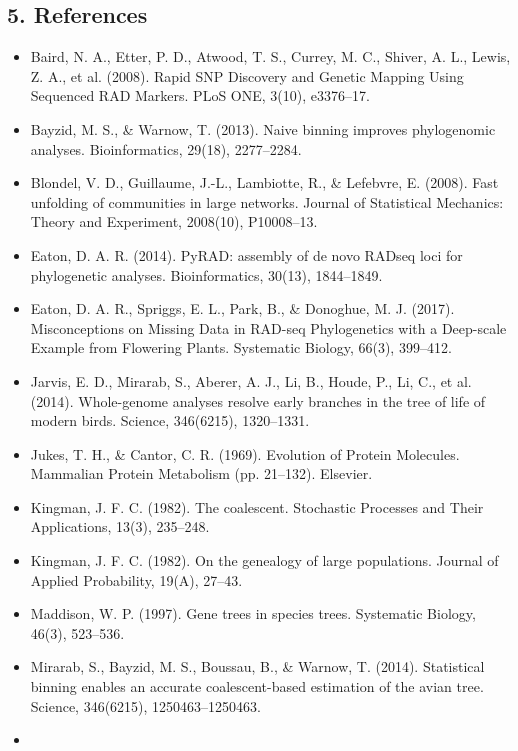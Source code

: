 \documentclass[11pt]{article}
\providecommand{\tightlist}{%
      \setlength{\itemsep}{0pt}\setlength{\parskip}{0pt}}
\begin{document}
    \subsection{5. References}\label{references}

\begin{itemize}
\tightlist
\item
  Baird, N. A., Etter, P. D., Atwood, T. S., Currey, M. C., Shiver, A.
  L., Lewis, Z. A., et al. (2008). Rapid SNP Discovery and Genetic
  Mapping Using Sequenced RAD Markers. PLoS ONE, 3(10), e3376--17.
\item
  Bayzid, M. S., \& Warnow, T. (2013). Naive binning improves
  phylogenomic analyses. Bioinformatics, 29(18), 2277--2284.
\item
  Blondel, V. D., Guillaume, J.-L., Lambiotte, R., \& Lefebvre, E.
  (2008). Fast unfolding of communities in large networks. Journal of
  Statistical Mechanics: Theory and Experiment, 2008(10), P10008--13.
\item
  Eaton, D. A. R. (2014). PyRAD: assembly of de novo RADseq loci for
  phylogenetic analyses. Bioinformatics, 30(13), 1844--1849.
\item
  Eaton, D. A. R., Spriggs, E. L., Park, B., \& Donoghue, M. J. (2017).
  Misconceptions on Missing Data in RAD-seq Phylogenetics with a
  Deep-scale Example from Flowering Plants. Systematic Biology, 66(3),
  399--412.
\item
  Jarvis, E. D., Mirarab, S., Aberer, A. J., Li, B., Houde, P., Li, C.,
  et al. (2014). Whole-genome analyses resolve early branches in the
  tree of life of modern birds. Science, 346(6215), 1320--1331.
\item
  Jukes, T. H., \& Cantor, C. R. (1969). Evolution of Protein Molecules.
  Mammalian Protein Metabolism (pp. 21--132). Elsevier.
\item
  Kingman, J. F. C. (1982). The coalescent. Stochastic Processes and
  Their Applications, 13(3), 235--248.
\item
  Kingman, J. F. C. (1982). On the genealogy of large populations.
  Journal of Applied Probability, 19(A), 27--43.
\item
  Maddison, W. P. (1997). Gene trees in species trees. Systematic
  Biology, 46(3), 523--536.
\item
  Mirarab, S., Bayzid, M. S., Boussau, B., \& Warnow, T. (2014).
  Statistical binning enables an accurate coalescent-based estimation of
  the avian tree. Science, 346(6215), 1250463--1250463.
\item

\end{itemize}
\end{document}
